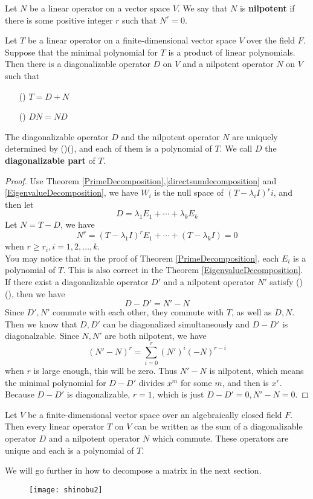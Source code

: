 \documentclass{article}
\begin{document}
\begin{dde}
	Let $N$ be a linear operator on a vector space $V$. We say that $N$ is \textbf{nilpotent} if there is some positive integer $r$ such that $N^r=0$.
\end{dde}
\begin{thm}
	Let $T$ be a linear operator on a finite-dimensional vector space $V$ over the field $F$. Suppose that the minimal polynomial for $T$ is a product of linear polynomials. Then there is a diagonalizable operator $D$ on $V$ and a nilpotent operator $N$ on $V$ such that
	\begin{enumerate}
		\item [(\romannumeral1)]$T=D+N$
		\item [(\romannumeral2)]$DN=ND$
	\end{enumerate}
	The diagonalizable operator $D$ and the nilpotent operator $N$ are uniquely determined by ()(), and each of them is a polynomial of $T$. We call $D$ the \textbf{diagonalizable part} of $T$.
\end{thm}
\begin{proof}
	Use Theorem \ref{PrimeDecomposition},\ref{directsumdecomposition} and \ref{EigenvalueDecomposition}, we have $W_i$ is the null space of $(T-\lambda_i I)^r{i}$, and then let
	\[D=\lambda_1E_1+\cdots+\lambda_kE_k\]
	Let $N=T-D$, we have
	\[N^r=(T-\lambda_1 I)^rE_1+\cdots+(T-\lambda_k I)=0\]
	when $r\ge r_i,i=1,2,\dots,k$.\\
	You may notice that in the proof of Theorem \ref{PrimeDecomposition}, each $E_i$ is a polynomial of $T$. This is also correct in the Theorem \ref{EigenvalueDecomposition}.\\
	If there exist a diagonalizable operator $D'$ and a nilpotent operator $N'$ satisfy ()(), then we have
	\[D-D'=N'-N\]
	Since $D',N'$ commute with each other, they commute with $T$, as well as $D,N$. Then we know that $D,D'$ can be diagonalized simultaneously and $D-D'$ is diagonalzable. Since $N,N'$ are both nilpotent, we have
	\[(N'-N)^r=\sum\limits_{i=0}^r(N')^i(-N)^{r-i}\]
	when $r$ is large enough, this will be zero. Thus $N'-N$ is nilpotent, which means the minimal polynomial for $D-D'$ divides $x^m$ for some $m$, and then is $x^r$. Because $D-D'$ is diagonalizable, $r=1$, which is just $D-D'=0,N'-N=0$.
\end{proof}
\begin{coro}
	Let $V$ be a finite-dimensional vector space over an algebraically closed field $F$. Then every linear operator $T$ on $V$ can be written as the sum of a diagonalizable operator $D$ and a nilpotent operator $N$ which commute. These operators are unique and each is a polynomial of $T$.
\end{coro}
We will go further in how to decompose a matrix in the next section.
\begin{figure}[htbp]
	\centering
	\texttt{[image: shinobu2]}
\end{figure}
\newpage
\end{document}
